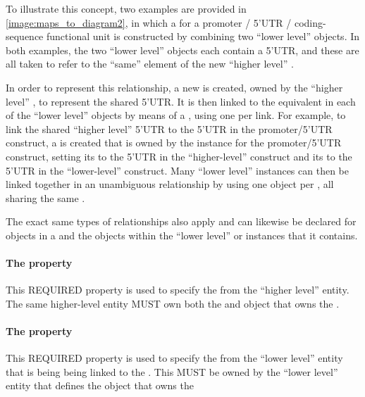 To illustrate this concept, two examples are provided in \ref{image:maps_to_diagram2}, in which a  for a promoter / 5'UTR / coding-sequence functional unit is constructed by combining two ``lower level''  objects.
In both examples, the two ``lower level''  objects each contain a 5'UTR, and these are all taken to refer to the ``same'' element of the new ``higher level'' .

In order to represent this relationship, a new  is created, owned by the ``higher level'' , to represent the shared 5'UTR.  
It is then linked to the equivalent  in each of the ``lower level''  objects by means of a , using one  per link.  
For example, to link the shared ``higher level'' 5'UTR to the 5'UTR in the promoter/5'UTR construct, a  is created that is owned by the  instance for the promoter/5'UTR construct, setting its  to the 5'UTR  in the ``higher-level'' construct and its  to the 5'UTR  in the ``lower-level'' construct.
Many ``lower level'' instances can then be linked together in an unambiguous relationship by using one  object per , all sharing the same .

The exact same types of relationships also apply and can likewise be declared for  objects in a  and the 
 objects within the ``lower level''  or  instances that it contains.


\paragraph{The  property}\label{sec:local}
This REQUIRED property is used to specify the  from the ``higher level'' entity.  The same higher-level entity MUST own both the  and object that owns the .

\paragraph{The  property}\label{sec:remote}
This REQUIRED property is used to specify the  from the ``lower level'' entity that is being being linked to the  .  This  MUST be owned by the ``lower level'' entity that defines the object that owns the 

